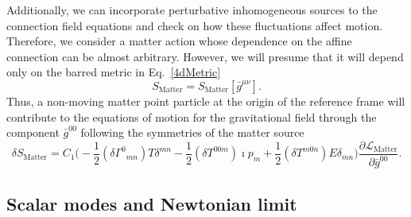 \documentclass{ws-mpla}
\renewcommand{\(}{\left(}
\renewcommand{\)}{\right)}
\renewcommand{\[}{\left[}
\renewcommand{\]}{\right]}
\begin{document}
Additionally, we can incorporate perturbative inhomogeneous sources to the connection field equations and check on how these fluctuations affect motion. Therefore, we consider a matter action whose dependence on the affine connection can be almost arbitrary. However, we will presume that it will depend only on the barred metric in Eq.~\eqref{4dMetric}
$$ S_{\text{Matter}} = {S}_{\text{Matter}}[\bar{g}^{\mu\nu}].$$
Thus, a non-moving matter point particle at the origin of the reference frame will contribute to the equations of motion for the gravitational field through the component $\bar{g}^{00}$ following the symmetries of the matter source 
\begin{equation}
  \label{mattervariation}
  \delta {S}_{\text{Matter}} =  C_1 \Big(- \frac{1}{2} ({\delta\Gamma}^{0}{}_{m n})  T {\delta}^{m n} - \frac{1}{2}  ({\delta T}^{0 0 m})  \imath {p}_{m} + \frac{1}{2}  ({\delta T}^{m 0 n})  E {\delta}_{m n} \Big)\frac{\partial\mathcal{L}_{\text{Matter}}}{\partial \bar{g}^{00}}.
\end{equation}


\subsection{Scalar modes  and Newtonian limit}
\end{document}
